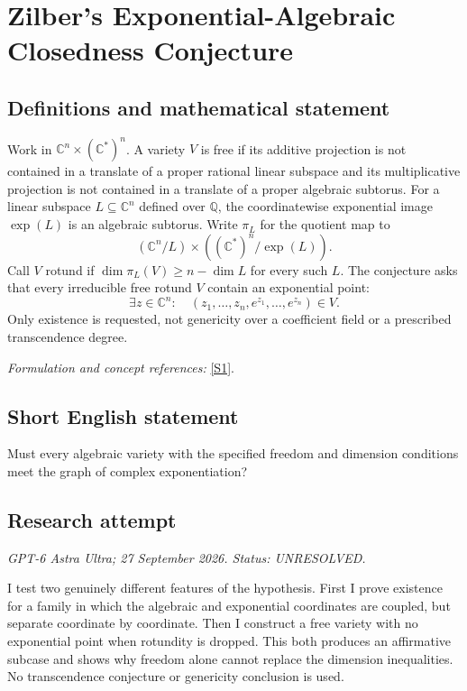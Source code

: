 \documentclass[11pt]{article}
\begin{document}
\section*{\texorpdfstring{Zilber's Exponential-Algebraic Closedness Conjecture}{Zilber's Exponential-Algebraic Closedness Conjecture}}\label{441}
\subsection{Definitions and mathematical statement}
Work in ${\mathbb{C}}^n\times({\mathbb{C}}^*)^n$. A variety $V$ is free if its additive projection is not contained in a translate of a proper rational linear subspace and its multiplicative projection is not contained in a translate of a proper algebraic subtorus. For a linear subspace $L\subseteq{\mathbb{C}}^n$ defined over ${\mathbb{Q}}$, the coordinatewise exponential image $\exp(L)$ is an algebraic subtorus. Write $\pi_L$ for the quotient map to
\[
 ({\mathbb{C}}^n/L)\times(({\mathbb{C}}^*)^n/\exp(L)).
\]
Call $V$ rotund if $\dim\pi_L(V)\ge n-\dim L$ for every such $L$. The conjecture asks that every irreducible free rotund $V$ contain an exponential point:
\[
 \exists z\in{\mathbb{C}}^n:\quad (z_1,\ldots,z_n,e^{z_1},\ldots,e^{z_n})\in V.
\]
Only existence is requested, not genericity over a coefficient field or a prescribed transcendence degree.
\par\smallskip\textit{Formulation and concept references:} \href{https://link.springer.com/article/10.1007/s00029-023-00853-y}{[S1]}.

\subsection{Short English statement}
Must every algebraic variety with the specified freedom and dimension conditions meet the graph of complex exponentiation?
\subsection{Research attempt}
\textit{GPT-6 Astra Ultra; 27 September 2026. Status: UNRESOLVED.}

I test two genuinely different features of the hypothesis. First I prove
existence for a family in which the algebraic and exponential coordinates
are coupled, but separate coordinate by coordinate. Then I construct a
free variety with no exponential point when rotundity is dropped. This
both produces an affirmative subcase and shows why freedom alone cannot
replace the dimension inequalities. No transcendence conjecture or
genericity conclusion is used.
\end{document}
